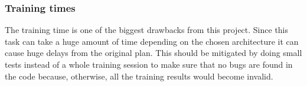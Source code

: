 \subsubsection{Training times}

The training time is one of the biggest drawbacks from this project. Since this task
can take a huge amount of time depending on the chosen architecture it can cause
huge delays from the original plan. This should be mitigated by doing small tests
instead of a whole training session to make sure that no bugs are found in the code 
because, otherwise, all the training results would become invalid.
